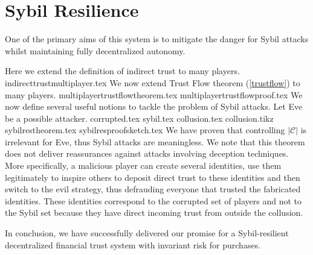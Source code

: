 \section{Sybil Resilience}
  One of the primary aims of this system is to mitigate the danger for Sybil attacks \cite{sybilattack} whilst maintaining
  fully decentralized autonomy.

  Here we extend the definition of indirect trust to many players.
  {indirecttrustmultiplayer.tex}
  \noindent We now extend Trust Flow theorem (\ref{trustflow}) to many players.
  {multiplayertrustflowtheorem.tex}
  {multiplayertrustflowproof.tex}
  \noindent We now define several useful notions to tackle the problem of Sybil attacks. Let Eve be a possible attacker.
  {corrupted.tex}
  {sybil.tex}
  {collusion.tex}
  {collusion.tikz}
  {sybilrestheorem.tex}
  {sybilresproofsketch.tex}
  We have proven that controlling $|\mathcal{C}|$ is irrelevant for Eve, thus Sybil attacks are meaningless. We note that
  this theorem does not deliver reassurances against attacks involving deception techniques. More specifically, a malicious
  player can create several identities, use them legitimately to inspire others to deposit direct trust to these identities
  and then switch to the evil strategy, thus defrauding everyone that trusted the fabricated identities. These identities
  correspond to the corrupted set of players and not to the Sybil set because they have direct incoming trust from outside
  the collusion.

  In conclusion, we have successfully delivered our promise for a Sybil-resilient decentralized financial trust system with
  invariant risk for purchases.

